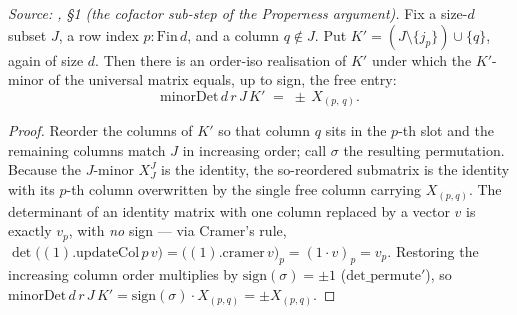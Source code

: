 \begin{lemma}\label{mk-lem:gr_free_entry_eq_signed_minor}
  \leanok

  \textit{Source: \cite{nitsure-hilbert-quot}, \S 1 (the cofactor sub-step of the Properness argument).}
  Fix a size-\(d\) subset \(J\), a row index \(p : \mathrm{Fin}\,d\), and a column \(q \notin J\). Put
  \(K' = (J \setminus \{j_p\}) \cup \{q\}\), again of size \(d\). Then there is an order-iso realisation of
  \(K'\) under which the \(K'\)-minor of the universal matrix equals, up to sign, the free entry:
  \[
    \mathrm{minorDet}\,d\,r\,J\,K' \;=\; \pm\, X_{(p,\,q)} .
  \]
\end{lemma}
\begin{proof}
  \leanok
  Reorder the columns of \(K'\) so that column \(q\) sits in the \(p\)-th slot and the remaining columns
  match \(J\) in increasing order; call \(\sigma\) the resulting permutation. Because the \(J\)-minor
  \(X^J_J\) is the identity, the so-reordered submatrix is the identity with its \(p\)-th column overwritten
  by the single free column carrying \(X_{(p,q)}\). The determinant of an identity matrix with one column
  replaced by a vector \(v\) is exactly \(v_p\), with \emph{no} sign --- via Cramer's rule,
  \(\det\bigl((1).\mathrm{updateCol}\,p\,v\bigr) = \bigl((1).\mathrm{cramer}\,v\bigr)_p
  = (\mathrm{1}\cdot v)_p = v_p\). Restoring the increasing column order multiplies by \(\mathrm{sign}(\sigma)
  = \pm 1\) (\(\mathrm{det\_permute}'\)), so \(\mathrm{minorDet}\,d\,r\,J\,K' = \mathrm{sign}(\sigma)\cdot
  X_{(p,q)} = \pm X_{(p,q)}\).
\end{proof}


